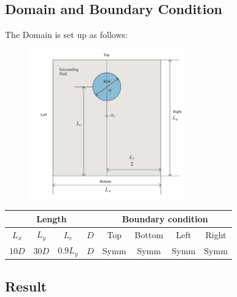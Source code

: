 \documentclass[12pt]{article}
\begin{document}
\subsection{Domain and Boundary Condition}
The Domain is set up as follows:
\begin{figure}[H]
    \centering
    \includegraphics[width=0.6\textwidth]{Latex/figures/Domain.jpg}
    \label{deformation}
\end{figure}



\begin{table}[ht]
\scriptsize
\centering
\renewcommand{\arraystretch}{1.5} %
\begin{tabular}{|c|c|c|c|c|c|c|c|}
\hline
\multicolumn{4}{|c|}{\textbf{Length}} & \multicolumn{4}{c|}{\textbf{Boundary condition}} \\
\hline
$L_x$ & $L_y$ & $L_c$ & $D$   & Top & Bottom & Left & Right \\
\hline
$10D$ & $30D$ & $0.9L_y$ & $D$   & Symm & Symm & Symm & Symm \\
\hline
\end{tabular}
\end{table}















\subsection{Result}
\end{document}
